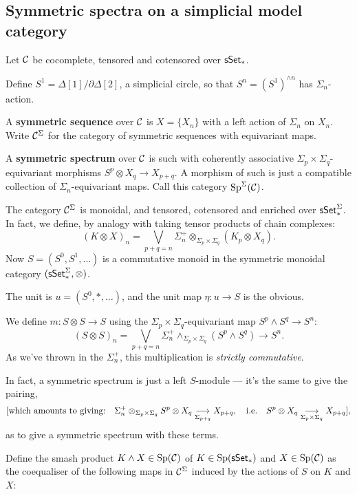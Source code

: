 \documentclass[11pt]{article}
\begin{document}
\begin{MichaelStableModelCats}
\subsection{Symmetric spectra on a simplicial model category}
\begin{itemise}
\item Let $\calC$ be cocomplete, tensored and cotensored over $\sSet_*$.
\item Define $S^1=\Delta[1]/\partial\Delta[2]$, a simplicial circle, so that $S^n=(S^1)^{\wedge n}$ has $\Sigma_n$-action.
\item A \textbf{symmetric sequence} over $\calC$ is $X=\{X_n\}$ with a left action of $\Sigma_n$ on $X_n$. Write $\calC^\Sigma$ for the category of symmetric sequences with equivariant maps.
\item A \textbf{symmetric spectrum} over $\calC$ is such with coherently associative $\Sigma_p\times\Sigma_q$-equivariant morphisms $S^p\otimes X_q\to X_{p+q}$. A morphism of such is just a compatible collection of $\Sigma_n$-equivariant maps. Call this category $\Sp^\Sigma(\calC)$.
\item The category $\calC^\Sigma$ is monoidal, and tensored, cotensored and enriched over $\sSet_*^\Sigma$. In fact, we define, by analogy with taking tensor products of chain complexes:
\[(K\otimes X)_n=\bigvee_{p+q=n}\Sigma_n^+\otimes_{\Sigma_p\times\Sigma_q}(K_p\otimes X_q).\]
Now $S=(S^0,S^1,\ldots)$ is a commutative monoid in the symmetric monoidal category $(\sSet_*^\Sigma,\otimes)$.
\begin{itemise}
\item The unit is $u=(S^0,*,\ldots)$, and the unit map $\eta:u\to S$ is the obvious. 
\item We define $m:S\otimes S\to S$   using the $\Sigma_p\times\Sigma_q$-equivariant map $S^p\wedge S^q\to S^n$:
\[(S\otimes S)_n=\bigvee_{p+q=n}\Sigma_n^+\wedge_{\Sigma_p\times\Sigma_q}(S^p\wedge S^q)\to S^n.\]
As we've thrown in the $\Sigma_n^+$, this multiplication is \emph{strictly commutative}.
\end{itemise}
\item In fact, a symmetric spectrum is just a left $S$-module --- it's the same to give the pairing, 
\[\text{[which amounts to giving:\quad}\Sigma_n^+\otimes_{\Sigma_p\times\Sigma_q} S^p\otimes X_q\underset{\Sigma_{p+q}}{\to} X_{p+q},\quad\text{i.e.}\quad S^p\otimes X_q\underset{\Sigma_p\times\Sigma_q}{\to} X_{p+q}\text{]},\]
as to give a symmetric spectrum with these terms.
\item Define the smash product  $K\wedge X\in\Sp(\calC)$ of $K\in \Sp(\sSet_*)$ and $X\in \Sp(\calC)$ as the coequaliser of the following maps in $\calC^\Sigma$ induced by the actions of $S$ on $K$ and $X$:

\end{itemise}
\end{MichaelStableModelCats}
\end{document}
